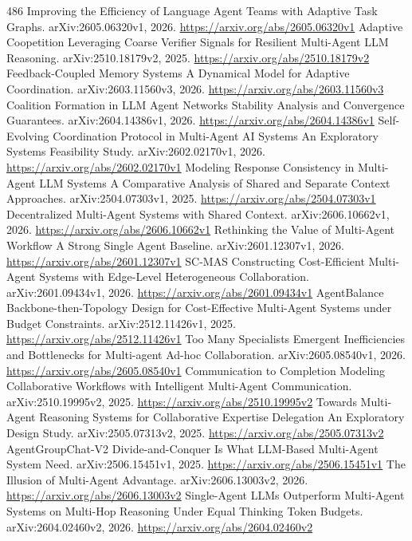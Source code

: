\documentclass[11pt]{article}
\begin{document}
\begin{thebibliography}{486}
 Improving the Efficiency of Language Agent Teams with Adaptive Task Graphs. arXiv:2605.06320v1, 2026. \url{https://arxiv.org/abs/2605.06320v1}
 Adaptive Coopetition Leveraging Coarse Verifier Signals for Resilient Multi-Agent LLM Reasoning. arXiv:2510.18179v2, 2025. \url{https://arxiv.org/abs/2510.18179v2}
 Feedback-Coupled Memory Systems A Dynamical Model for Adaptive Coordination. arXiv:2603.11560v3, 2026. \url{https://arxiv.org/abs/2603.11560v3}
 Coalition Formation in LLM Agent Networks Stability Analysis and Convergence Guarantees. arXiv:2604.14386v1, 2026. \url{https://arxiv.org/abs/2604.14386v1}
 Self-Evolving Coordination Protocol in Multi-Agent AI Systems An Exploratory Systems Feasibility Study. arXiv:2602.02170v1, 2026. \url{https://arxiv.org/abs/2602.02170v1}
 Modeling Response Consistency in Multi-Agent LLM Systems A Comparative Analysis of Shared and Separate Context Approaches. arXiv:2504.07303v1, 2025. \url{https://arxiv.org/abs/2504.07303v1}
 Decentralized Multi-Agent Systems with Shared Context. arXiv:2606.10662v1, 2026. \url{https://arxiv.org/abs/2606.10662v1}
 Rethinking the Value of Multi-Agent Workflow A Strong Single Agent Baseline. arXiv:2601.12307v1, 2026. \url{https://arxiv.org/abs/2601.12307v1}
 SC-MAS Constructing Cost-Efficient Multi-Agent Systems with Edge-Level Heterogeneous Collaboration. arXiv:2601.09434v1, 2026. \url{https://arxiv.org/abs/2601.09434v1}
 AgentBalance Backbone-then-Topology Design for Cost-Effective Multi-Agent Systems under Budget Constraints. arXiv:2512.11426v1, 2025. \url{https://arxiv.org/abs/2512.11426v1}
 Too Many Specialists Emergent Inefficiencies and Bottlenecks for Multi-agent Ad-hoc Collaboration. arXiv:2605.08540v1, 2026. \url{https://arxiv.org/abs/2605.08540v1}
 Communication to Completion Modeling Collaborative Workflows with Intelligent Multi-Agent Communication. arXiv:2510.19995v2, 2025. \url{https://arxiv.org/abs/2510.19995v2}
 Towards Multi-Agent Reasoning Systems for Collaborative Expertise Delegation An Exploratory Design Study. arXiv:2505.07313v2, 2025. \url{https://arxiv.org/abs/2505.07313v2}
 AgentGroupChat-V2 Divide-and-Conquer Is What LLM-Based Multi-Agent System Need. arXiv:2506.15451v1, 2025. \url{https://arxiv.org/abs/2506.15451v1}
 The Illusion of Multi-Agent Advantage. arXiv:2606.13003v2, 2026. \url{https://arxiv.org/abs/2606.13003v2}
 Single-Agent LLMs Outperform Multi-Agent Systems on Multi-Hop Reasoning Under Equal Thinking Token Budgets. arXiv:2604.02460v2, 2026. \url{https://arxiv.org/abs/2604.02460v2}

\end{thebibliography}
\end{document}

